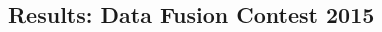 \documentclass[a0,landscape]{a0poster}
\newenvironment{myalign}{\par\nobreak\large\noindent\align}{\endalign}
\newcommand{\abs}[1]{\left\lvert#1\right\rvert}
\begin{document}
\begin{multicols}{4}

\subsection*{Results: Data Fusion Contest 2015 \cite{7536139}}
\label{sec:DFCexperiment}



\end{multicols}
\end{document}
